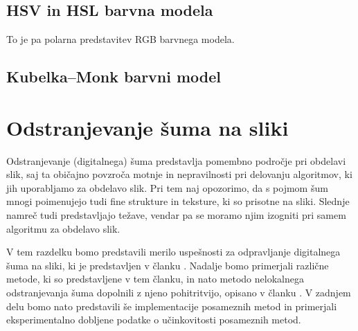 %
\subsection{HSV in HSL barvna modela}
%
To je pa polarna predstavitev RGB barvnega modela.
%
\subsection{Kubelka--Monk barvni model}
\section{Odstranjevanje šuma na sliki}
%
Odstranjevanje (digitalnega) šuma predstavlja pomembno področje pri obdelavi slik, saj ta običajno povzroča motnje in nepravilnosti pri delovanju algoritmov, ki jih uporabljamo za obdelavo slik. Pri tem naj opozorimo, da s pojmom šum mnogi poimenujejo tudi fine strukture in teksture, ki so prisotne na sliki. Slednje namreč tudi predstavljajo težave, vendar pa se moramo njim izogniti pri samem algoritmu za obdelavo slik.

V tem razdelku bomo predstavili merilo uspešnosti za odpravljanje digitalnega šuma na sliki, ki je predstavljen v članku \cite{Buades:NLA}. Nadalje bomo primerjali različne metode, ki so predstavljene v tem članku, in nato metodo nelokalnega odstranjevanja šuma dopolnili z njeno pohitritvijo, opisano v članku \cite{Wang:fastNMD}. V zadnjem delu bomo nato predstavili še implementacije posameznih metod in primerjali eksperimentalno dobljene podatke o učinkovitosti posameznih metod.
%
